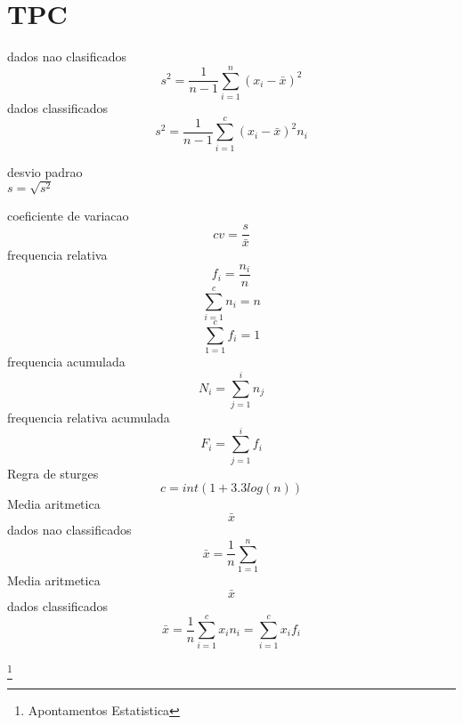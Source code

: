 
%
%
\tableofcontents
%
\appendix
%
\pagestyle{plain}%

\part{TPC}\label{anunciado}
dados nao clasificados
\[s^2 = \frac{1}{n-1}\sum_{i=1}^n (x_i-\bar{x})^2\]
dados classificados
\[s^2 = \frac{1}{n-1}\sum_{i=1}^c (x_i-\bar{x})^2 n_i\]

desvio padrao\\

$s = \sqrt{s^2}$

coeficiente de variacao\\
\[cv = \frac{s}{\bar{x}}\]
frequencia relativa\\
\[f_i = \frac{n_i}{n}\]
\[\sum_{i=1}^cn_i = n\]
\[\sum_{1=1}^cf_i = 1\]
frequencia acumulada\\
\[N_i = \sum_{j=1}^in_j\]
frequencia relativa acumulada\\
\[F_i = \sum_{j=1}^if_i\]
Regra de sturges\\
\[c = int(1+3.3log(n))\]
Media aritmetica \[\bar{x}\] dados nao classificados\\
\[\bar{x} = \frac{1}{n}\sum_{1=1}^n\]
Media aritmetica \[\bar{x}\] dados classificados\\
\[\bar{x} = \frac{1}{n}\sum_{i=1}^cx_in_i = \sum_{i=1}^cx_if_i\]



%
%

%
%
\listoffigures
%
\cite{*}

%
%
\footnote{Apontamentos Estatistica}
%

%
%